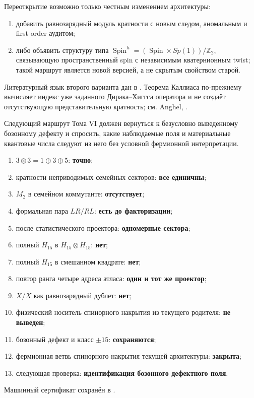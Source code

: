 Переоткрытие возможно только честным изменением архитектуры:
\begin{enumerate}
 \item добавить равнозарядный модуль кратности с новым следом,
 аномальным и first-order аудитом;
 \item либо объявить структуру типа
 $\operatorname{Spin}^h=(\operatorname{Spin}\times Sp(1))/\mathbb Z_2$,
 связывающую пространственный spin с независимым кватернионным twist;
 такой маршрут является новой версией, а не скрытым свойством старой.
\end{enumerate}
Литературный язык второго варианта дан в
. Теорема Каллиаса по-прежнему вычисляет индекс
уже заданного Дирака--Хиггса оператора и не создаёт отсутствующую
представительную кратность; см. Anghel,
.

Следующий маршрут Тома VI должен вернуться к безусловно выведенному
бозонному дефекту и спросить, какие наблюдаемые поля и материальные
квантовые числа следуют из него без условной фермионной интерпретации.

\begin{protocol}
\begin{enumerate}
 \item $3\otimes3=1\oplus3\oplus5$: \textbf{точно};
 \item кратности неприводимых семейных секторов: \textbf{все единичны};
 \item $M_2$ в семейном коммутанте: \textbf{отсутствует};
 \item формальная пара $LR/RL$: \textbf{есть до факторизации};
 \item после статистического проектора: \textbf{одномерные сектора};
 \item полный $H_{15}$ в $H_{15}\otimes H_{15}$: \textbf{нет};
 \item полный $H_{15}$ в смешанном квадрате: \textbf{нет};
 \item повтор ранга четыре адреса атласа: \textbf{один и тот же проектор};
 \item $X/\bar X$ как равнозарядный дублет: \textbf{нет};
 \item физический носитель спинорного накрытия из текущего родителя:
 \textbf{не выведен};
 \item бозонный дефект и класс $\pm15$: \textbf{сохраняются};
 \item фермионная ветвь спинорного накрытия текущей архитектуры: \textbf{закрыта};
 \item следующая проверка: \textbf{идентификация бозонного дефектного поля}.
\end{enumerate}
\end{protocol}

Машинный сертификат сохранён в
.